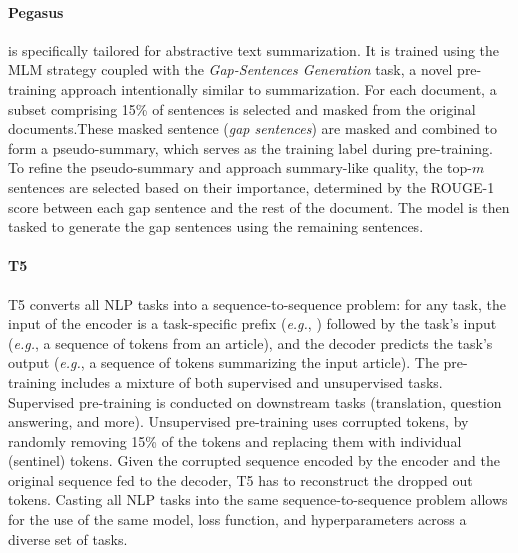 \paragraph{Pegasus} \citep{zhang2020pegasus} is specifically tailored for abstractive text summarization. It is trained using the \ac{MLM} strategy coupled with the \textit{Gap-Sentences Generation} task, a novel pre-training approach intentionally similar to summarization. For each document, a subset comprising 15\% of sentences is selected and masked from the original documents.These masked sentence (\textit{gap sentences}) are masked and combined to form a pseudo-summary, which serves as the training label during pre-training. To refine the pseudo-summary and approach summary-like quality, the top-$m$ sentences are selected based on their importance, determined by the \ac{ROUGE}-1 score between each gap sentence and the rest of the document. The model is then tasked to generate the gap sentences using the remaining sentences.


\paragraph{T5} \ac{T5} \citep{raffel2020exploring} converts all \ac{NLP} tasks into a sequence-to-sequence problem: for any task, the input of the encoder is a task-specific prefix (\textit{e.g.}, ) followed by the task's input (\textit{e.g.}, a sequence of tokens from an article), and the decoder predicts the task's output (\textit{e.g.}, a sequence of tokens summarizing the input article). The pre-training includes a mixture of both supervised and unsupervised tasks. Supervised pre-training is conducted on downstream tasks (translation, question answering, and more). Unsupervised pre-training uses corrupted tokens, by randomly removing 15\% of the tokens and replacing them with individual (sentinel) tokens. Given the corrupted sequence encoded by the encoder and the original sequence fed to the decoder, \ac{T5} has to reconstruct the dropped out tokens. Casting all \ac{NLP} tasks into the same sequence-to-sequence problem allows for the use of the same model, loss function, and hyperparameters across a diverse set of tasks. 

